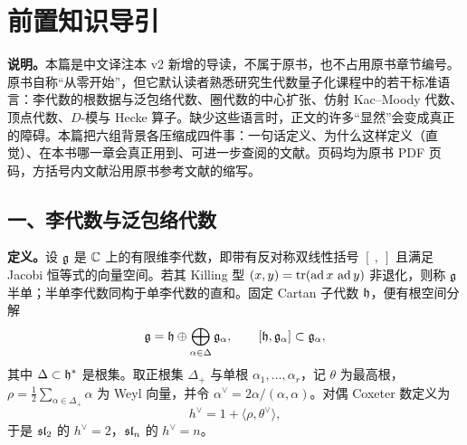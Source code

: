 
\chapter*{前置知识导引}

\noindent\textbf{说明。}本篇是中文译注本 v2 新增的导读，不属于原书，也不占用原书章节编号。原书自称“从零开始”，但它默认读者熟悉研究生代数量子化课程中的若干标准语言：李代数的根数据与泛包络代数、圈代数的中心扩张、仿射 Kac--Moody 代数、顶点代数、$D$-模与 Hecke 算子。缺少这些语言时，正文的许多“显然”会变成真正的障碍。本篇把六组背景各压缩成四件事：一句话定义、为什么这样定义（直觉）、在本书哪一章会真正用到、可进一步查阅的文献。页码均为原书 PDF 页码，方括号内文献沿用原书参考文献的缩写。

\section*{一、李代数与泛包络代数}

\textbf{定义。}设 $\mathfrak{g}$ 是 $\mathbb{C}$ 上的有限维李代数，即带有反对称双线性括号 $[\ ,\ ]$ 且满足 Jacobi 恒等式的向量空间。若其 Killing 型 $(x,y)=\operatorname{tr}(\operatorname{ad} x\,\operatorname{ad} y)$ 非退化，则称 $\mathfrak{g}$ 半单；半单李代数同构于单李代数的直和。固定 Cartan 子代数 $\mathfrak{h}$，便有根空间分解
\[
  \mathfrak{g}=\mathfrak{h}\oplus\bigoplus_{\alpha\in\Delta}\mathfrak{g}_\alpha,\qquad
  [\mathfrak{h},\mathfrak{g}_\alpha]\subset\mathfrak{g}_\alpha ,
\]
其中 $\Delta\subset\mathfrak{h}^*$ 是根集。取正根集 $\Delta_+$ 与单根 $\alpha_1,\dots,\alpha_r$，记 $\theta$ 为最高根，$\rho=\tfrac12\sum_{\alpha\in\Delta_+}\alpha$ 为 Weyl 向量，并令 $\alpha^\vee=2\alpha/(\alpha,\alpha)$。对偶 Coxeter 数定义为
\[
  h^\vee=1+\langle \rho,\theta^\vee\rangle ,
\]
于是 $\mathfrak{sl}_2$ 的 $h^\vee=2$，$\mathfrak{sl}_n$ 的 $h^\vee=n$。

